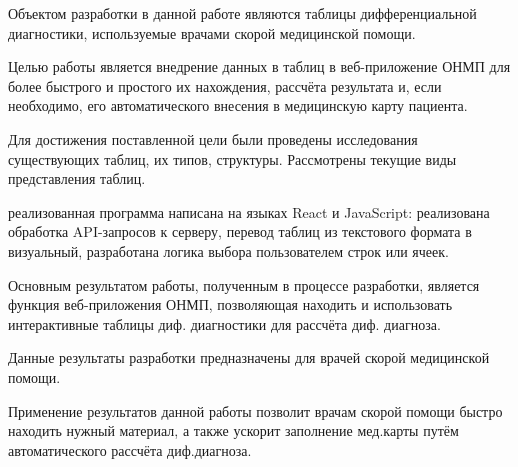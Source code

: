 \abstract %


Объектом разработки в данной работе являются таблицы дифференциальной диагностики, используемые врачами скорой медицинской помощи. 

Целью работы является внедрение данных в таблиц в веб-приложение ОНМП для более быстрого и простого их нахождения, рассчёта результата и, если необходимо, его автоматического внесения в медицинскую карту пациента.

Для достижения поставленной цели были проведены исследования существующих таблиц, их типов, структуры. Рассмотрены текущие виды представления таблиц. 

реализованная программа написана на языках React и JavaScript: реализована обработка API-запросов к серверу, перевод таблиц из текстового формата в визуальный, разработана логика выбора пользователем строк или ячеек.

Основным результатом работы, полученным в процессе разработки, является функция веб-приложения ОНМП, позволяющая находить и использовать интерактивные таблицы диф. диагностики для рассчёта диф. диагноза. 

Данные результаты разработки предназначены для врачей скорой медицинской помощи.

Применение результатов данной работы позволит врачам скорой помощи быстро находить нужный материал, а также ускорит заполнение мед.карты путём автоматического рассчёта диф.диагноза.
